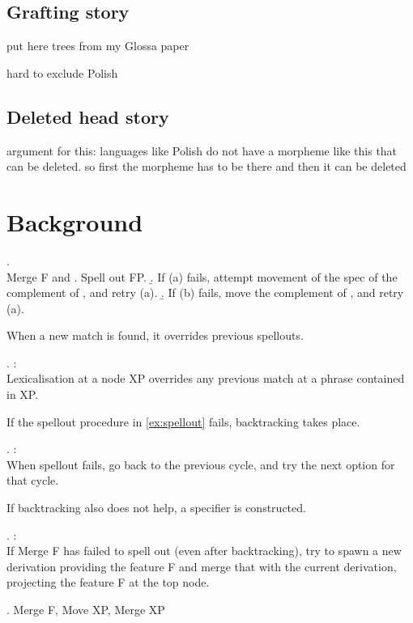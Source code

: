 \subsection{Grafting story}




put here trees from my Glossa paper



hard to exclude Polish



\subsection{Deleted head story}

argument for this: languages like Polish do not have a morpheme like this that can be deleted.
so first the morpheme has to be there and then it can be deleted














\section{Background}

\ex. \\
Merge F and \label{ex:spellout}
 \a. Spell out FP.
 \b. If (a) fails, attempt movement of the spec of the complement of , and retry (a).
 \b. If (b) fails, move the complement of , and retry (a).

When a new match is found, it overrides previous spellouts.

\ex.  \citep{starke2018}:\\
Lexicalisation at a node XP overrides any previous match at a phrase contained in XP.

If the spellout procedure in \ref{ex:spellout} fails, backtracking takes place.

\ex.  \citep{starke2018}:\\
When spellout fails, go back to the previous cycle, and try the next option for that cycle.\label{ex:backtracking}

If backtracking also does not help, a specifier is constructed.

\ex.  \citep{starke2018}:\\
If Merge F has failed to spell out (even after backtracking), try to spawn a new derivation providing the feature F and merge that with the current derivation, projecting the feature F at the top node.\label{ex:specformation}

\ex. Merge F, Move XP, Merge XP

\phantom{hi}
